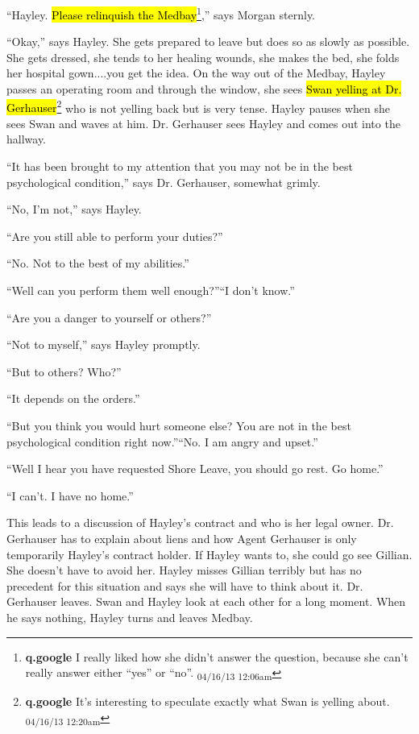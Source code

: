 ``Hayley. \hl{Please relinquish the Medbay}\footnote{\textbf{q.google }I really liked how she didn't answer the question, because she can't really answer either ``yes'' or ``no''. \textsubscript{04/16/13 12:06am}},'' says Morgan sternly.

``Okay,'' says Hayley.  She gets prepared to leave but does so as slowly as possible.  She gets dressed, she tends to her healing wounds, she makes the bed, she folds her hospital gown....you get the idea.  On the way out of the Medbay, Hayley passes an operating room and through the window, she sees \hl{Swan yelling at Dr. Gerhauser}\footnote{\textbf{q.google }It's interesting to speculate exactly what Swan is yelling about. \textsubscript{04/16/13 12:20am}} who is not yelling back but is very tense.  Hayley pauses when she sees Swan and waves at him.  Dr. Gerhauser sees Hayley and comes out into the hallway.



``It has been brought to my attention that you may not be in the best psychological condition,'' says Dr. Gerhauser, somewhat grimly.

``No, I'm not,'' says Hayley.

``Are you still able to perform your duties?''

``No.  Not to the best of my abilities.''

``Well can you perform them well enough?''``I don't know.''

``Are you a danger to yourself or others?''

``Not to myself,'' says Hayley promptly.

``But to others?  Who?''

``It depends on the orders.''

``But you think you would hurt someone else?  You are not in the best psychological condition right now.''``No.  I am angry and upset.''

``Well I hear you have requested Shore Leave, you should go rest. Go home.''

``I can't.  I have no home.''

This leads to a discussion of Hayley's contract and who is her legal owner.  Dr. Gerhauser has to explain about liens and how Agent Gerhauser is only temporarily Hayley's contract holder.  If Hayley wants to, she could go see Gillian.  She doesn't have to avoid her.  Hayley misses Gillian terribly but has no precedent for this situation and says she will have to think about it.  Dr. Gerhauser leaves.  Swan and Hayley look at each other for a long moment.  When he says nothing, Hayley turns and leaves Medbay.



